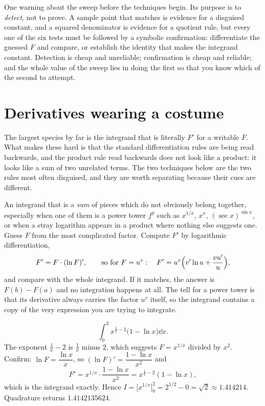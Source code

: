 One warning about the sweep before the techniques begin. Its purpose is to \emph{detect}, not to prove. A sample point that matches is evidence for a disguised constant, and a squared denominator is evidence for a quotient rule, but every one of the six tests must be followed by a symbolic confirmation: differentiate the guessed $F$ and compare, or establish the identity that makes the integrand constant. Detection is cheap and unreliable; confirmation is cheap and reliable; and the whole value of the sweep lies in doing the first so that you know which of the second to attempt.

\section{Derivatives wearing a costume}

The largest species by far is the integrand that is literally $F'$ for a writable $F$. What makes these hard is that the standard differentiation rules are being read backwards, and the product rule read backwards does not look like a product: it looks like a sum of two unrelated terms. The two techniques below are the two rules most often disguised, and they are worth separating because their cues are different.

\cue An integrand that is a \emph{sum} of pieces which do not obviously belong together, especially when one of them is a power tower $f^{g}$ such as $x^{1/x}$, $x^{x}$, $(\sec x)^{\sin x}$, or when a stray logarithm appears in a product where nothing else suggests one.
\method Guess $F$ from the most complicated factor. Compute $F'$ by logarithmic differentiation,
\[F'=F\cdot(\ln F)',\qquad\text{so for }F=u^{v}:\quad F'=u^{v}\Bigl(v'\ln u+\frac{vu'}{u}\Bigr),\]
and compare with the whole integrand. If it matches, the answer is $F(b)-F(a)$ and no integration happens at all. The tell for a power tower is that its derivative always carries the factor $u^{v}$ itself, so the integrand contains a copy of the very expression you are trying to integrate.

\begin{worked}
\[\int_0^{2}x^{\frac1x-2}\bigl(1-\ln x\bigr)\dd x.\]
The exponent $\tfrac1x-2$ is $\tfrac1x$ minus $2$, which suggests $F=x^{1/x}$ divided by $x^{2}$. Confirm: $\ln F=\dfrac{\ln x}{x}$, so $(\ln F)'=\dfrac{1-\ln x}{x^{2}}$ and
\[F'=x^{1/x}\cdot\frac{1-\ln x}{x^{2}}=x^{\frac1x-2}(1-\ln x),\]
which is the integrand exactly. Hence $I=\bigl[x^{1/x}\bigr]_0^{2}=2^{1/2}-0=\sqrt2\approx1.414214$. Quadrature returns $1.4142135624$.
\end{worked}

